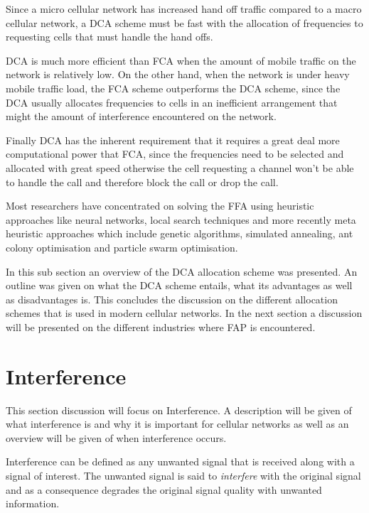 Since a micro cellular network has increased hand off traffic compared to a macro cellular network, a DCA scheme must be fast with the allocation of frequencies to requesting cells that must handle the hand offs\cite{PrinciplesMobileCommunication,WirelessCommunications,MobileWirelessCommunicationss}.

DCA is much more efficient than FCA when the amount of mobile traffic on the network is relatively low. On the other hand, when the network is under heavy mobile traffic load, the FCA scheme outperforms the DCA scheme, since the DCA usually allocates frequencies to cells in an inefficient arrangement that might the amount of interference encountered on the network\cite{PrinciplesMobileCommunication,WirelessCommunications,MobileWirelessCommunicationss}.

Finally DCA has the inherent requirement that it requires a great deal more computational power that FCA, since the frequencies need to be selected and allocated with great speed otherwise the cell requesting a channel won't be able to handle the call and therefore block the call or drop the call\cite{PrinciplesMobileCommunication,WirelessCommunications,MobileWirelessCommunicationss}.

Most researchers have concentrated on solving the FFA using heuristic approaches like neural networks, local search techniques and more recently meta heuristic approaches which include genetic algorithms, simulated annealing, ant colony optimisation and particle swarm optimisation.

In this sub section an overview of the DCA allocation scheme was presented. An outline was given on what the DCA scheme entails, what its advantages as well as disadvantages is. This concludes the discussion on the different allocation schemes that is used in modern cellular networks. In the next section a discussion will be presented on the different industries where FAP is encountered.

\section{Interference}
\label{sec:Interference}
This section discussion will focus on Interference. A description will be given of what interference is and why it is important for cellular networks as well as an overview will be given of when interference occurs.

Interference can be defined as any unwanted signal that is received along with a signal of interest. The unwanted signal is said to \emph{interfere} with the original signal and as a consequence degrades the original signal quality with unwanted information\cite{WirelessDigitalCommunications}.

